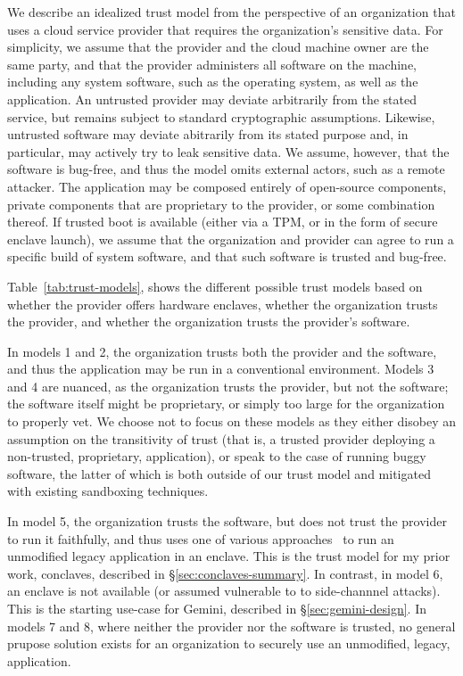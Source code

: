 We describe an idealized trust model from the perspective of an
organization that uses a cloud service provider that requires the organization's
sensitive data.
%
For simplicity, we assume that the provider and the cloud machine owner are the
same party, and that the provider administers all software on the machine,
including any system software, such as the operating system, as well as the
application.
%
An untrusted provider may deviate arbitrarily from the stated service, but
remains subject to standard cryptographic assumptions.
%
Likewise, untrusted software may deviate abitrarily from its stated purpose
and, in particular, may actively try to leak sensitive data.
%
We assume, however, that the software is bug-free, and thus the model omits
external actors, such as a remote attacker.
%
The application may be composed entirely of open-source components, private
components that are proprietary to the provider, or some combination thereof.
%
If trusted boot is available  (either via a TPM, or in the form of secure
enclave launch), we assume that the organization and provider can agree to run
a specific build of system software, and that such software is trusted and
bug-free.


Table~\ref{tab:trust-models}, shows the different possible trust models based
on whether the provider offers hardware enclaves, whether the organization
trusts the provider, and whether the organization trusts the provider's
software.


In models 1 and 2, the organization trusts both
the provider and the software, and thus the application may be run in a
conventional environment.
%
Models 3 and 4 are nuanced, as the organization trusts the provider, but not
the software; the software itself might be proprietary, or simply too large for
the organization to properly vet.
%
We choose not to focus on these models as they either disobey an assumption on
the transitivity of trust (that is, a trusted provider deploying a non-trusted,
proprietary, application), or speak to the case of running buggy software,
the latter of which is both outside of our trust model and mitigated with
existing sandboxing techniques.


In model 5, the organization trusts the software, but does not trust the
provider to run it faithfully, and thus uses one of various
approaches~\cite{talos,haven,scone,graphene} to
run an unmodified legacy application in an enclave.
%
This is the trust model for my prior work, conclaves, described in
\S\ref{sec:conclaves-summary}.
%
In contrast, in model 6, an enclave is not available (or assumed vulnerable to
to side-channnel attacks).
%
This is the starting use-case for Gemini, described in
\S\ref{sec:gemini-design}.
%
In models 7 and 8, where neither the provider nor the software is trusted, no
general prupose solution exists for an organization to securely use an
unmodified, legacy, application.


